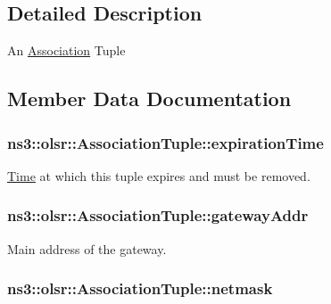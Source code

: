 \subsection{Detailed Description}
An \hyperlink{structns3_1_1olsr_1_1Association}{Association} Tuple 

\subsection{Member Data Documentation}
\subsubsection[{\texorpdfstring{expiration\+Time}{expirationTime}}]{ ns3\+::olsr\+::\+Association\+Tuple\+::expiration\+Time}\hypertarget{structns3_1_1olsr_1_1AssociationTuple_a9becaf0d713a9ed1db7834d0f3cdb864}{}\label{structns3_1_1olsr_1_1AssociationTuple_a9becaf0d713a9ed1db7834d0f3cdb864}


\hyperlink{classns3_1_1Time}{Time} at which this tuple expires and must be removed. 

\subsubsection[{\texorpdfstring{gateway\+Addr}{gatewayAddr}}]{ ns3\+::olsr\+::\+Association\+Tuple\+::gateway\+Addr}\hypertarget{structns3_1_1olsr_1_1AssociationTuple_ac4ff331773f72df266b29f5474f48c3c}{}\label{structns3_1_1olsr_1_1AssociationTuple_ac4ff331773f72df266b29f5474f48c3c}


Main address of the gateway. 

\subsubsection[{\texorpdfstring{netmask}{netmask}}]{ ns3\+::olsr\+::\+Association\+Tuple\+::netmask}\hypertarget{structns3_1_1olsr_1_1AssociationTuple_a513cb45c5fedf9fabbe015606f05bfcb}{}\label{structns3_1_1olsr_1_1AssociationTuple_a513cb45c5fedf9fabbe015606f05bfcb}


